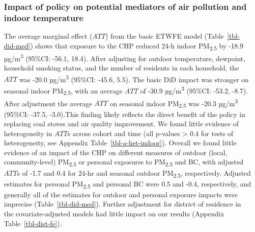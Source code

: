\documentclass[
  letterpaper,
  DIV=11,
  numbers=noendperiod]{scrartcl}
\begin{document}
\subsubsection{Impact of policy on potential mediators of air pollution
and indoor
temperature}\label{impact-of-policy-on-potential-mediators-of-air-pollution-and-indoor-temperature}

The average marginal effect (\(ATT\)) from the basic ETWFE model
(Table~\ref{tbl-did-med}) shows that exposure to the CHP reduced 24-h
indoor PM\textsubscript{2.5} by -18.9 µg/m\textsuperscript{3} (95\%CI:
-56.1, 18.4). After adjusting for outdoor temperature, dewpoint,
household smoking status, and the number of residents in each household,
the \(ATT\) was -20.0 µg/m\textsuperscript{3} (95\%CI: -45.6, 5.5). The
basic DiD impact was stronger on seasonal indoor PM\textsubscript{2.5},
with an average \(ATT\) of -30.9 µg/m\textsuperscript{3} (95\%CI: -53.2,
-8.7). After adjustment the average \(ATT\) on seasonal indoor
PM\textsubscript{2.5} was -20.3 µg/m\textsuperscript{3} (95\%CI: -37.5,
-3.0).This finding likely reflects the direct benefit of the policy in
replacing coal stoves and air quality improvement. We found
 little evidence of heterogeneity in \(ATT\)s across
cohort and time (all p-values \textgreater{} 0.4 for tests of
heterogeneity, see Appendix Table~\ref{tbl-a-het-indoor}). Overall we
found little evidence of an impact of the CHP on different measures of
outdoor (local, community-level) PM\textsubscript{2.5} or personal
exposures to PM\textsubscript{2.5} and BC, with adjusted \(ATT\)s of
-1.7 and 0.4 for 24-hr and seasonal outdoor PM\textsubscript{2.5},
respectively. Adjusted estimates for personal PM\textsubscript{2.5} and
personal BC were 0.5 and -0.4, respectively, and generally all of the
estimates for outdoor and personal exposure impacts were imprecise
(Table~\ref{tbl-did-med}). Further adjustment  for
district of residence in the covariate-adjusted models had little impact
on our results (Appendix Table~\ref{tbl-dist-fe}).
\end{document}
